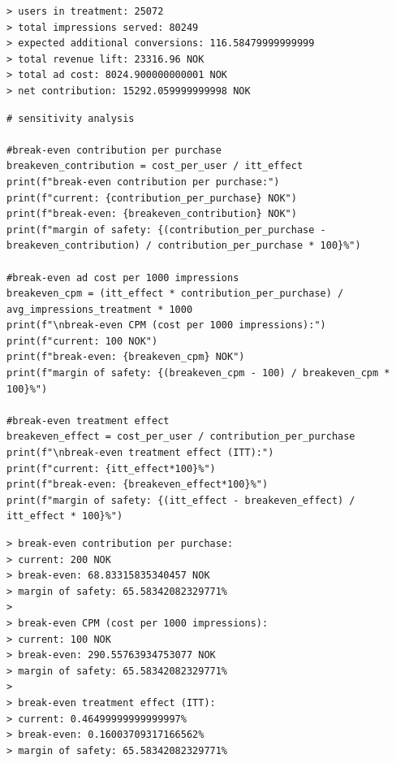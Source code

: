 \documentclass[10pt]{article}
\begin{document}
\begin{verbatim}
> users in treatment: 25072
> total impressions served: 80249
> expected additional conversions: 116.58479999999999
> total revenue lift: 23316.96 NOK
> total ad cost: 8024.900000000001 NOK
> net contribution: 15292.059999999998 NOK
\end{verbatim}
\newpage 
\begin{lstlisting}
# sensitivity analysis

#break-even contribution per purchase
breakeven_contribution = cost_per_user / itt_effect
print(f"break-even contribution per purchase:")
print(f"current: {contribution_per_purchase} NOK")
print(f"break-even: {breakeven_contribution} NOK")
print(f"margin of safety: {(contribution_per_purchase - breakeven_contribution) / contribution_per_purchase * 100}%")

#break-even ad cost per 1000 impressions
breakeven_cpm = (itt_effect * contribution_per_purchase) / avg_impressions_treatment * 1000
print(f"\nbreak-even CPM (cost per 1000 impressions):")
print(f"current: 100 NOK")
print(f"break-even: {breakeven_cpm} NOK")
print(f"margin of safety: {(breakeven_cpm - 100) / breakeven_cpm * 100}%")

#break-even treatment effect
breakeven_effect = cost_per_user / contribution_per_purchase
print(f"\nbreak-even treatment effect (ITT):")
print(f"current: {itt_effect*100}%")
print(f"break-even: {breakeven_effect*100}%")
print(f"margin of safety: {(itt_effect - breakeven_effect) / itt_effect * 100}%")
\end{lstlisting}
\begin{verbatim}
> break-even contribution per purchase:
> current: 200 NOK
> break-even: 68.83315835340457 NOK
> margin of safety: 65.58342082329771%
> 
> break-even CPM (cost per 1000 impressions):
> current: 100 NOK
> break-even: 290.55763934753077 NOK
> margin of safety: 65.58342082329771%
> 
> break-even treatment effect (ITT):
> current: 0.46499999999999997%
> break-even: 0.16003709317166562%
> margin of safety: 65.58342082329771%
\end{verbatim}
\newpage 
\end{document}
